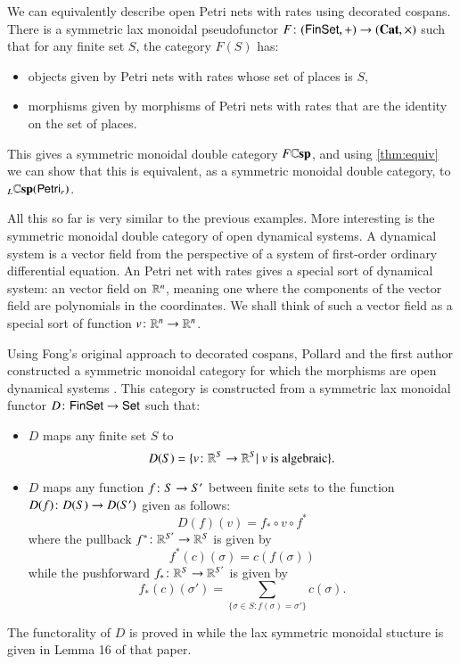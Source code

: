 \documentclass[reqno]{amsart}
\begin{document}
We can equivalently describe open Petri nets with rates using decorated cospans.  There is a symmetric lax monoidal pseudofunctor $F \colon (\mathsf{Fin}\mathsf{Set}, +) \to (\mathbf{Cat}, \times)$ such that for any finite set $S$, the category $F(S)$ has:
\begin{itemize}
\item objects given by Petri nets with rates whose set of places is $S$,
\item morphisms given by morphisms of Petri nets with rates that are the identity on the set of places.
\end{itemize}
This gives a symmetric monoidal double category $F \mathbf{\mathbb Csp}$, and using \cref{thm:equiv} we can show that this is equivalent, as a symmetric monoidal double category, to ${}_L \mathbf{\mathbb Csp}(\mathsf{Petri}_r)$.

All this so far is very similar to the previous examples.  More interesting is the symmetric monoidal double category of open dynamical systems.   A dynamical system is a vector field from the perspective of a system of first-order ordinary differential equation.  An Petri net with rates gives a special sort of dynamical system: an  vector field on $\mathbb{R}^n$, meaning one where the components of the vector field are polynomials in the coordinates. We shall think of such a vector field as a special sort of function $v \colon \mathbb{R}^n \to \mathbb{R}^n$.

Using Fong's original approach to decorated cospans, Pollard and the first author constructed a symmetric monoidal category for which the morphisms are open dynamical systems \cite[Theorem 17]{BP}.  This category is constructed from a symmetric lax monoidal functor 
$D \colon \mathsf{Fin}\mathsf{Set} \to \mathsf{Set}$ such that:
\begin{itemize}
\item $D$ maps any finite set $S$ to 
\[ D(S) = \{ v \colon \mathbb{R}^S \to \mathbb{R}^S | \; v \textrm{ is algebraic}  \}. \]
\item $D$ maps any function $f \colon S \to S'$ between finite sets to the function $D(f) \colon D(S) \to D(S')$ given as follows:
\[ D(f)(v) = f_* \circ v \circ f^* \]
where the pullback $ f^* \colon \mathbb{R}^{S'} \to \mathbb{R}^S $ is given by
\[ f^*(c)(\sigma) = c(f(\sigma)) \] 
while the pushforward $ f_* \colon \mathbb{R}^{S} \to \mathbb{R}^{S'} $ is given by
\[ f_*(c)(\sigma') = \sum_{ \{ \sigma \in S : f(\sigma) = \sigma' \} } c(\sigma). \]
\end{itemize}
The functorality of $D$ is proved in \cite[Lemma 15]{BP} while the lax symmetric monoidal stucture is given in Lemma 16 of that paper.
\end{document}
